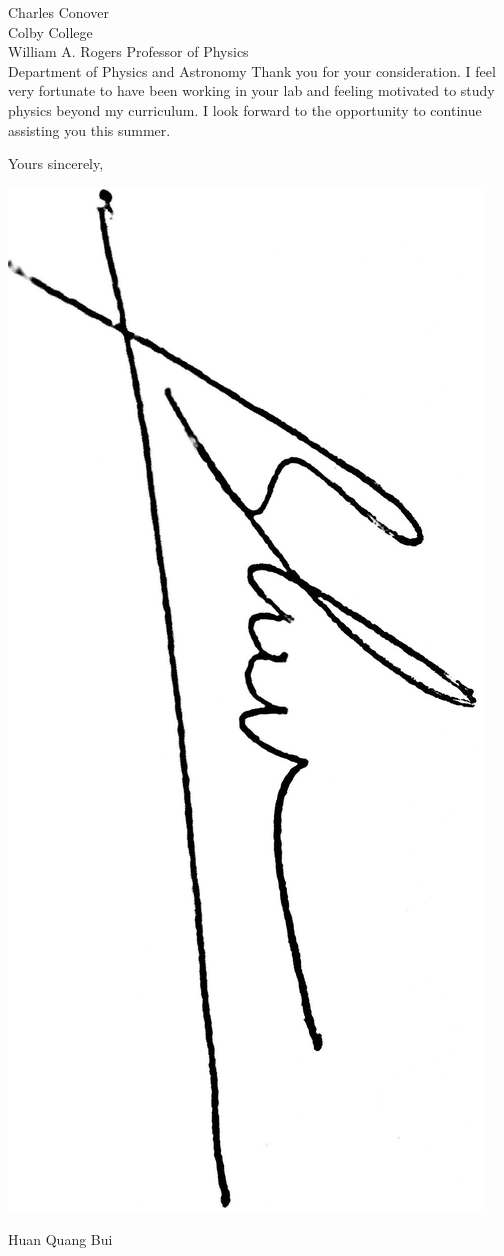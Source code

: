 \documentclass{letter}
\begin{document}
\begin{letter}{Charles Conover \\Colby College\\William A. Rogers Professor of Physics\\ Department of Physics and Astronomy}
		Thank you for your consideration. I feel very fortunate to have been working in your lab and feeling motivated to study physics beyond my curriculum. I look forward to the opportunity to continue assisting you this summer. 
		
		Yours sincerely,
		
		\includegraphics[scale=0.03, angle=90]{IMG_0789.JPG}
		
		Huan Quang Bui
		
	\end{letter}
	
\end{document}
